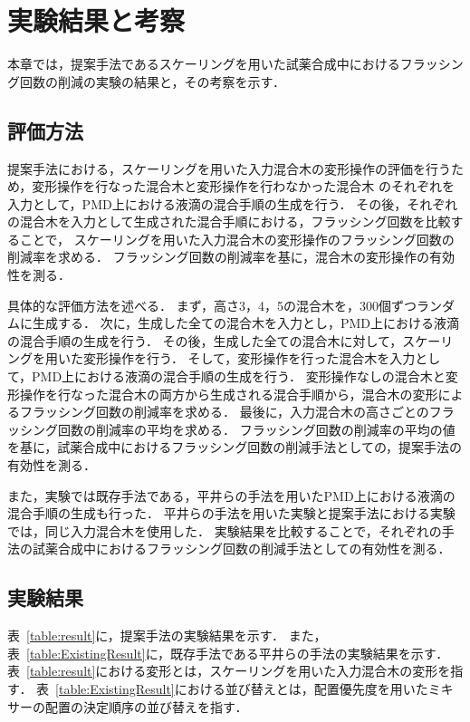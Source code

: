 \chapter{実験結果と考察}
本章では，提案手法であるスケーリングを用いた試薬合成中におけるフラッシング回数の削減の実験の結果と，その考察を示す．

\section{評価方法}
提案手法における，スケーリングを用いた入力混合木の変形操作の評価を行うため，変形操作を行なった混合木と変形操作を行わなかった混合木
のそれぞれを入力として，PMD上における液滴の混合手順の生成を行う．
その後，それぞれの混合木を入力として生成された混合手順における，フラッシング回数を比較することで，
スケーリングを用いた入力混合木の変形操作のフラッシング回数の削減率を求める．
フラッシング回数の削減率を基に，混合木の変形操作の有効性を測る．

具体的な評価方法を述べる．
まず，高さ3，4，5の混合木を，300個ずつランダムに生成する．
次に，生成した全ての混合木を入力とし，PMD上における液滴の混合手順の生成を行う．
その後，生成した全ての混合木に対して，スケーリングを用いた変形操作を行う．
そして，変形操作を行った混合木を入力として，PMD上における液滴の混合手順の生成を行う．
変形操作なしの混合木と変形操作を行なった混合木の両方から生成される混合手順から，混合木の変形によるフラッシング回数の削減率を求める．
最後に，入力混合木の高さごとのフラッシング回数の削減率の平均を求める．
フラッシング回数の削減率の平均の値を基に，試薬合成中におけるフラッシング回数の削減手法としての，提案手法の有効性を測る．

また，実験では既存手法である，平井らの手法を用いたPMD上における液滴の混合手順の生成も行った．
平井らの手法を用いた実験と提案手法における実験では，同じ入力混合木を使用した．
実験結果を比較することで，それぞれの手法の試薬合成中におけるフラッシング回数の削減手法としての有効性を測る．

\section{実験結果}
表~\ref{table:result}に，提案手法の実験結果を示す．
また，表~\ref{table:ExistingResult}に，既存手法である平井らの手法の実験結果を示す．
表~\ref{table:result}における変形とは，スケーリングを用いた入力混合木の変形を指す．
表~\ref{table:ExistingResult}における並び替えとは，配置優先度を用いたミキサーの配置の決定順序の並び替えを指す．

